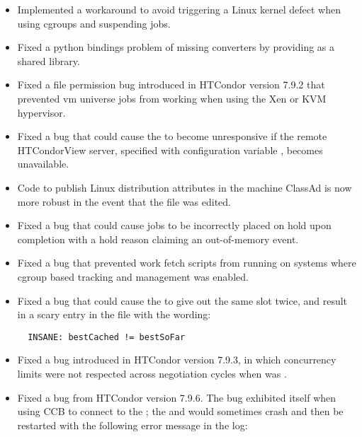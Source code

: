 \begin{itemize}

\item Implemented a workaround to avoid triggering a Linux kernel defect 
when using cgroups and suspending jobs.

\item Fixed a python bindings problem of missing converters by providing
 as a shared library.

\item Fixed a file permission bug introduced in HTCondor version 7.9.2 that
prevented vm universe jobs from working when using the Xen or KVM
hypervisor.

\item Fixed a bug that could cause the  to 
become unresponsive if the remote HTCondorView server, 
specified with configuration variable ,
becomes unavailable.

\item Code to publish Linux distribution attributes in the machine ClassAd
is now more robust in the event that the  file was edited.

\item Fixed a bug that could cause jobs to be incorrectly placed on hold upon
	completion with a hold reason claiming an out-of-memory event.

\item Fixed a bug that prevented work fetch scripts from running
on systems where cgroup based tracking and management was enabled.

\item Fixed a bug that could cause the  to give out the same
slot twice, and result in a scary entry in the  file 
with the wording:
\begin{verbatim}
  INSANE: bestCached != bestSoFar
\end{verbatim}

\item Fixed a bug introduced in HTCondor version 7.9.3,
in which concurrency limits were not respected across negotiation cycles when
 was .

\item Fixed a bug from HTCondor version 7.9.6. 
The bug exhibited itself when using CCB to connect to the ;
the  and  would sometimes crash and then be restarted
with the following error message in the log:


\end{itemize}
